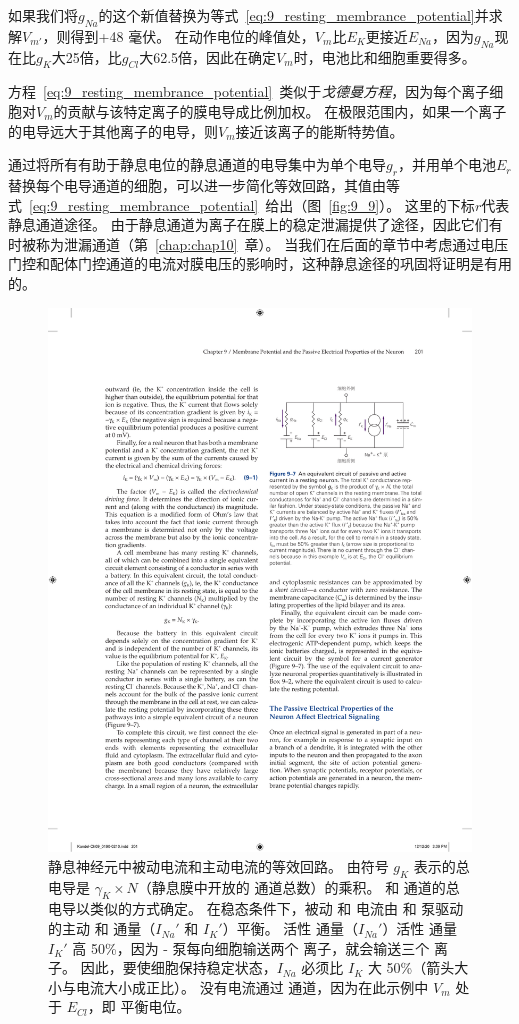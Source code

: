 \begin{proposition}[利用等效回路模型计算静息膜电位]
	\quad \quad 如果我们将$ g_{Na} $的这个新值替换为等式~\ref{eq:9_resting_membrance_potential}并求解$V_{m'}$，则得到+48 毫伏。
	在动作电位的峰值处，$V_m$比$E_K$更接近$ E_{Na} $，因为$ g_{Na} $现在比$ g_K $大25倍，比$ g_{Cl} $大62.5倍，因此在确定$V_m$时，电池比和细胞重要得多。
	
	\quad \quad 方程~\ref{eq:9_resting_membrance_potential}~类似于\textit{戈德曼方程}，因为每个离子细胞对$V_m$的贡献与该特定离子的膜电导成比例加权。
	在极限范围内，如果一个离子的电导远大于其他离子的电导，则$V_m$接近该离子的能斯特势值。
	
	\quad \quad 通过将所有有助于静息电位的静息通道的电导集中为单个电导$ g_r $，并用单个电池$ E_r $替换每个电导通道的细胞，可以进一步简化等效回路，其值由等式~\ref{eq:9_resting_membrance_potential}~给出（图~\ref{fig:9_9}）。
	这里的下标$ r $代表静息通道途径。
	由于静息通道为离子在膜上的稳定泄漏提供了途径，因此它们有时被称为泄漏通道（第~\ref{chap:chap10}~章）。
	当我们在后面的章节中考虑通过电压门控和配体门控通道的电流对膜电压的影响时，这种静息途径的巩固将证明是有用的。
	
\end{proposition}


\begin{figure}[htbp]
	\centering
	\includegraphics[width=0.55\linewidth]{chap09/fig_9_7}
	\caption{静息神经元中被动电流和主动电流的等效回路。
		由符号 $ g_K $ 表示的总  电导是 $ \gamma_K \times N $（静息膜中开放的  通道总数）的乘积。
		 和  通道的总电导以类似的方式确定。
		在稳态条件下，被动  和  电流由 和 泵驱动的主动  和  通量（$I_{Na}'$ 和 $I_K'$）平衡。
		活性  通量（$I_{Na}'$）活性  通量 $I_K'$ 高 50\%，因为 - 泵每向细胞输送两个  离子，就会输送三个  离子。
		因此，要使细胞保持稳定状态，$I_{Na}$ 必须比 $ I_K $ 大 50\%（箭头大小与电流大小成正比）。
		没有电流通过  通道，因为在此示例中 $ V_m $ 处于 $ E_{Cl} $，即  平衡电位。
	}
	\label{fig:9_7}
\end{figure}



